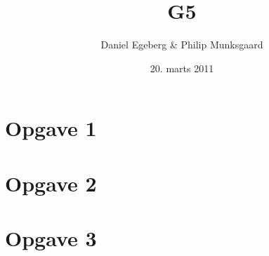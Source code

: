 \documentclass [10pt,a4paper]{article}
\title{G5}
\author{Daniel Egeberg \& Philip Munksgaard}
\date{20. marts 2011}
\begin{document}
\maketitle

\section*{Opgave 1} %


\section*{Opgave 2} %


\section*{Opgave 3} %

\end{document}
